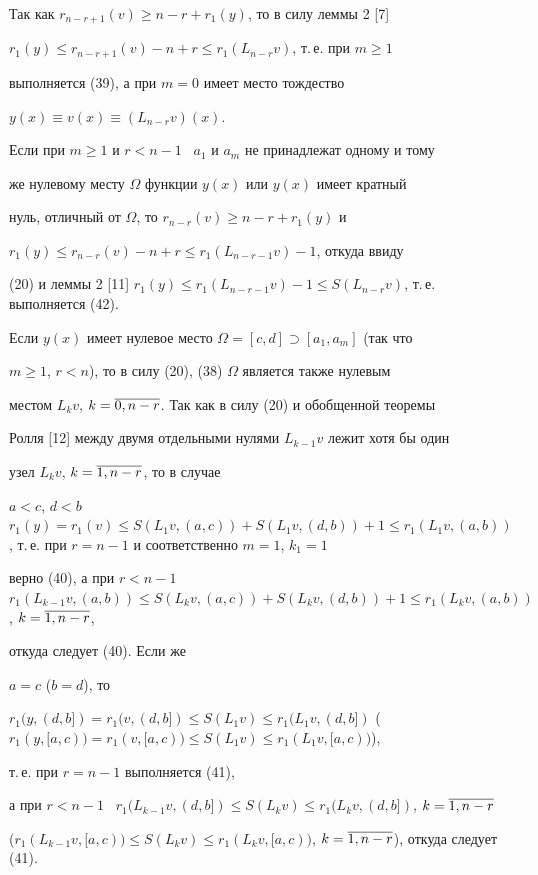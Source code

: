 \begin{pf}


Так как $r_{n-r+1}(v)\ge n-r+r_1(y)$, то в силу леммы 2 [7]


$r_1(y)\le r_{n-r+1}(v)-n+r\le r_1(L_{n-r}v)$, т.\,е. при $m\ge 1$


выполняется (39), а при $m=0$ имеет место тождество


$y(x)\equiv v(x)\equiv(L_{n-r}v)(x)$.





Если при $m\ge 1$ и $r<n-1$ \ $a_1$ и $a_m$ не принадлежат одному и тому


же нулевому месту $\Omega$ функции $y(x)$ или $y(x)$ имеет кратный


нуль, отличный от $\Omega$, то $r_{n-r}(v)\ge n-r+r_1(y)$ и


$r_1(y)\le r_{n-r}(v)-n+r\le r_1(L_{n-r-1}v)-1$, откуда ввиду


(20) и леммы 2 [11] $r_1(y)\le r_1(L_{n-r-1}v)-1\le


S(L_{n-r}v)$, т.\,е. выполняется (42).





Если $y(x)$ имеет нулевое место $\Omega=[c,d]\supset[a_1,a_m]$ (так что


$m\ge 1$, $r<n$), то в силу (20), (38) $\Omega$ является также нулевым


местом $L_kv$, $k=\overline{0,n-r}$. Так как в силу (20) и обобщенной теоремы


Ролля [12] между двумя отдельными нулями $L_{k-1}v$ лежит хотя бы один


узел $L_kv$, $k=\overline{1,n-r}$, то в случае


$a<c$, $d<b$ \ $r_1(y)=r_1(v)\le S(L_1v,(a,c))+S(L_1v,(d,b))+1\le r_1


(L_1v,(a,b))$, т.\,е. при $r=n-1$ и соответственно $m=1$, $k_1=1$ 


верно (40), а при $r<n-1$ \ $r_1(L_{k-1}v,(a,b))\le


S(L_kv,(a,c))+S(L_kv,(d,b))+1\le r_1(L_kv,(a,b))$, $k=\o{1,n-r}$,


откуда следует (40). Если же 


$a=c$ ($b=d$), то


$r_1(y,(d,b])=r_1(v,(d,b])\le S(L_1v)\le


r_1(L_1v,(d,b])$ ($r_1(y, [a,c))=r_1(v, [a,c))\le S(L_1v)\le r_1(L_1v, [a,c))$),


т.\,е. при $r=n-1$ выполняется (41),


а при $r<n-1$ \ $r_1(L_{k-1}v,(d,b])\le


S(L_kv)\le r_1(L_kv,(d,b])$, $k=\o{1,n-r}$ 


($r_1(L_{k-1}v, [a,c))\le


S(L_kv)\le r_1(L_kv, [a,c))$, $k=\o{1,n-r}$), откуда следует (41).


\end{pf}





